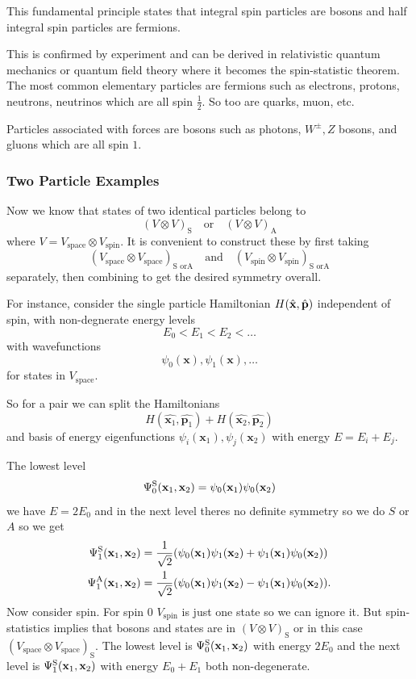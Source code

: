 \documentclass{article}
\begin{document}
This fundamental principle states that integral spin particles are bosons and half integral spin particles are  fermions.\par
This is confirmed by experiment and can be derived in relativistic quantum mechanics or quantum field theory where it becomes the spin-statistic theorem. The most common elementary particles are fermions such as electrons, protons, neutrons, neutrinos which are all spin $ \frac 12 $. So too are quarks, muon, etc.\par
Particles associated with forces are bosons such as photons, $ W^\pm, Z $ bosons, and gluons which are all spin $ 1 $. 
\subsubsection{Two Particle Examples}
Now we know that states of two identical particles belong to
\[
	(V\otimes V)_{\mathrm S} \quad \text{or}\quad (V\otimes V)_{\mathrm A}
\]
where $ V = V_{\mathrm{space}} \otimes V_{\mathrm{spin}} $. It is convenient to construct these by first taking 
\[
	(V_{\mathrm{space}} \otimes V_{\mathrm{space}})_{\mathrm S \text{ or} \mathrm A}\quad\text{and}\quad	(V_{\mathrm{spin}} \otimes V_{\mathrm{spin}})_{\mathrm S \text{ or} \mathrm A}
\]
separately, then combining to get the desired symmetry overall. \par
For instance, consider the single particle Hamiltonian $ H(\hat {\mathbf{x}}, \hat{\mathbf p}) $ independent of spin, with non-degnerate energy levels 
\[
  E_0 < E_1 < E_2 < \dots
\]
with wavefunctions
\[
  \psi_0(\mathbf x), \psi_1(\mathbf x), \dots
\]for states in $ V_{\mathrm{space}} $.\par
So for a pair we can split the Hamiltonians
\[
	H(\hat{\mathbf x_1}, \hat{\mathbf p_1}) + H(\hat{\mathbf x_2}, \hat{\mathbf p_2})
\]
and basis of energy eigenfunctions $ \psi_i(\mathbf x_1),\psi_j(\mathbf x_2) $ with energy $ E = E_i + E_j $.\par
The lowest level
\[
	\Psi^{\mathrm S}_0(\mathbf{x}_1,\mathbf{x}_2) = \psi_0(\mathbf{x}_1)\psi_0(\mathbf{x}_2)
\]
we have $ E = 2E_0 $ and in the next level theres no definite symmetry so we do $ S $ or $ A $ so we get
\begin{align*}
	\Psi_1^{\mathrm S}(\mathbf{x}_1,\mathbf{x}_2) &= \frac 1{\sqrt 2}(\psi_0(\mathbf{x}_1)\psi_1(\mathbf{x}_2) + \psi_1(\mathbf{x}_1)\psi_0(\mathbf{x}_2)) \\
	\Psi_1^{\mathrm A}(\mathbf{x}_1,\mathbf{x}_2) &= \frac 1{\sqrt 2}(\psi_0(\mathbf{x}_1)\psi_1(\mathbf{x}_2) - \psi_1(\mathbf{x}_1)\psi_0(\mathbf{x}_2)). \\
\end{align*}
Now consider spin. For spin $ 0 $ $ V_{\mathrm{spin}} $ is just one state so we can ignore it. But spin-statistics implies that bosons and states are in $ (V\otimes V)_{\mathrm S} $ or in this case $ (V_{\mathrm{space}}\otimes V_{\mathrm{space}})_{\mathrm S} $. The lowest level is $ \Psi_0^{\mathrm S}(\mathbf{x}_1,\mathbf{x}_2) $ with energy $ 2E_0 $ and the next level is $ \Psi_1^{\mathrm S}(\mathbf{x}_1,\mathbf{x}_2) $ with energy $ E_0+E_1 $ both non-degenerate.\par
\end{document}
